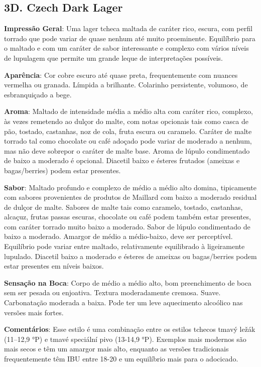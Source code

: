 \subsection*{3D. Czech Dark Lager}
\textbf{Impressão Geral}: Uma lager tcheca maltada de caráter rico, escura, com perfil torrado que pode variar de quase nenhum até muito proeminente. Equilíbrio para o maltado e com um caráter de sabor interessante e complexo com vários níveis de lupulagem que permite um grande leque de interpretações possíveis.

\textbf{Aparência}: Cor cobre escuro até quase preta, frequentemente com nuances vermelha ou granada. Límpida a brilhante. Colarinho persistente, volumoso, de esbranquiçado a bege.

\textbf{Aroma}: Maltado de intensidade média a médio alta com caráter rico, complexo, às vezes remetendo ao dulçor do malte, com notas opcionais tais como casca de pão, tostado, castanhas, noz de cola, fruta escura ou caramelo. Caráter de malte torrado tal como chocolate ou café adoçado pode variar de moderado a nenhum, mas não deve sobrepor o caráter de malte base. Aroma de lúpulo condimentado de baixo a moderado é opcional. Diacetil baixo e ésteres frutados (ameixas e bagas/berries) podem estar presentes.

\textbf{Sabor}: Maltado profundo e complexo de médio a médio alto domina, tipicamente com sabores provenientes de produtos de Maillard com baixo a moderado residual de dulçor de malte. Sabores de malte tais como caramelo, tostado, castanhas, alcaçuz, frutas passas escuras, chocolate ou café podem também estar presentes, com caráter torrado muito baixo a moderado. Sabor de lúpulo condimentado de baixo a moderado. Amargor de médio a médio-baixo, deve ser perceptível. Equilíbrio pode variar entre maltado, relativamente equilibrado à ligeiramente lupulado. Diacetil baixo a moderado e ésteres de ameixas ou bagas/berries podem estar presentes em níveis baixos.

\textbf{Sensação na Boca}: Corpo de médio a médio alto, bom preenchimento de boca sem ser pesada ou enjoativa. Textura moderadamente cremosa. Suave. Carbonatação moderada a baixa. Pode ter um leve aquecimento alcoólico nas versões mais fortes.

\textbf{Comentários}: Esse estilo é uma combinação entre os estilos tchecos tmavý ležák (11–12,9 °P) e tmavé speciální pivo (13-14,9 °P). Exemplos mais modernos são mais secos e têm um amargor mais alto, enquanto as versões tradicionais frequentemente têm IBU entre 18-20 e um equilíbrio mais para o adocicado.


